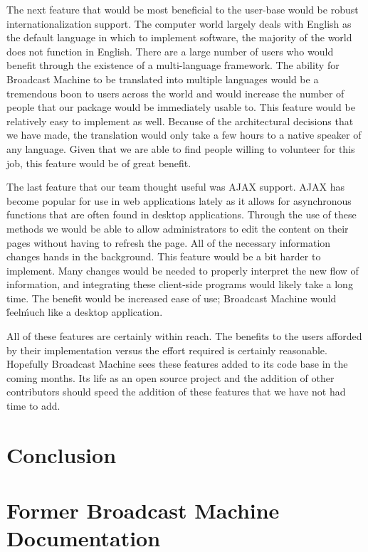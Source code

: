 \documentclass[a4paper,12pt]{report}
\begin{document}
The next feature that would be most beneficial to the user-base would be robust internationalization support.
The computer world largely deals with English as the default language in which to implement software, the majority of the world does not function in English.
There are a large number of users who would benefit through the existence of a multi-language framework.
The ability for Broadcast Machine to be translated into multiple languages would be a tremendous boon to users across the world and would increase the number of people that our package would be immediately usable to.
This feature would be relatively easy to implement as well.
Because of the architectural decisions that we have made, the translation would only take a few hours to a native speaker of any language.
Given that we are able to find people willing to volunteer for this job, this feature would be of great benefit.

The last feature that our team thought useful was AJAX support.
AJAX has become popular for use in web applications lately as it allows for asynchronous functions that are often found in desktop applications.
Through the use of these methods we would be able to allow administrators to edit the content on their pages without having to refresh the page.
All of the necessary information changes hands in the background.
This feature would be a bit harder to implement.
Many changes would be needed to properly interpret the new flow of information, and integrating these client-side programs would likely take a long time.
The benefit would be increased ease of use; Broadcast Machine would \'feel\' much like a desktop application.

All of these features are certainly within reach.
The benefits to the users afforded by their implementation versus the effort required is certainly reasonable.
Hopefully Broadcast Machine sees these features added to its code base in the coming months.
Its life as an open source project and the addition of other contributors should speed the addition of these features that we have not had time to add.
 
\chapter{Conclusion}

\appendix
\chapter{Former Broadcast Machine Documentation}
\end{document}
